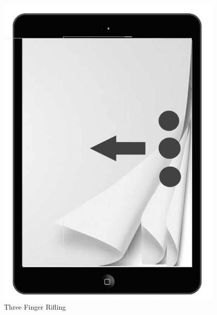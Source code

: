 \documentclass[11pt, oneside]{article}   	%
\begin{document}
\begin{figure}[!hb]
    \centering
    \includegraphics[scale=0.3]{Flip-2.jpg}
    \caption{Three Finger Rifling}
    \label{fig:Flip-2}
\end{figure}
\end{document}
